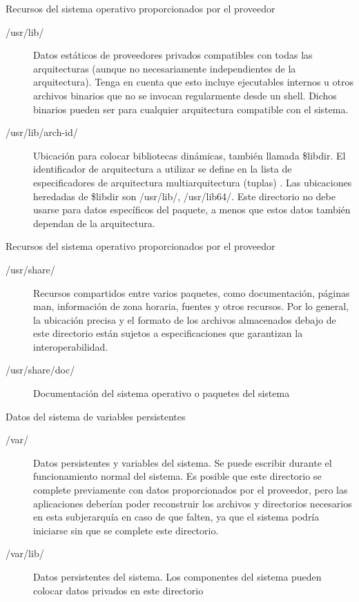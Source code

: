 \begin{frame}[c]{Recursos del sistema operativo proporcionados por el proveedor}
  \begin{description}
    \item [/usr/lib/] Datos estáticos de proveedores privados compatibles con
      todas las arquitecturas (aunque no necesariamente independientes de la
      arquitectura). Tenga en cuenta que esto incluye ejecutables internos u
      otros archivos binarios que no se invocan regularmente desde un shell.
      Dichos binarios pueden ser para cualquier arquitectura compatible con
      el sistema.
    \pausa
    \item [/usr/lib/arch-id/] Ubicación para colocar bibliotecas dinámicas,
      también llamada \$libdir. El identificador de arquitectura a utilizar
      se define en la lista de especificadores de arquitectura
      multiarquitectura (tuplas) . Las ubicaciones heredadas de \$libdir
      son /usr/lib/, /usr/lib64/. Este directorio no debe usarse para datos
      específicos del paquete, a menos que estos datos también dependan de la
      arquitectura.
  \end{description}
\end{frame}

\begin{frame}[c]{Recursos del sistema operativo proporcionados por el proveedor}
  \begin{description}
    \item [/usr/share/] Recursos compartidos entre varios paquetes, como
      documentación, páginas man, información de zona horaria, fuentes y otros
      recursos. Por lo general, la ubicación precisa y el formato de los
      archivos almacenados debajo de este directorio están sujetos a
      especificaciones que garantizan la interoperabilidad.
    \pausa
    \item [/usr/share/doc/] Documentación del sistema operativo o paquetes
      del sistema
  \end{description}
\end{frame}

\begin{frame}[c]{Datos del sistema de variables persistentes}
  \begin{description}
    \item [/var/] Datos persistentes y variables del sistema. Se puede escribir
      durante el funcionamiento normal del sistema. Es posible que este
      directorio se complete previamente con datos proporcionados por el
      proveedor, pero las aplicaciones deberían poder reconstruir los archivos
      y directorios necesarios en esta subjerarquía en caso de que falten, ya
      que el sistema podría iniciarse sin que se complete este directorio.
    \pausa
    \item [/var/lib/] Datos persistentes del sistema. Los componentes del
      sistema pueden colocar datos privados en este directorio
  \end{description}
\end{frame}

